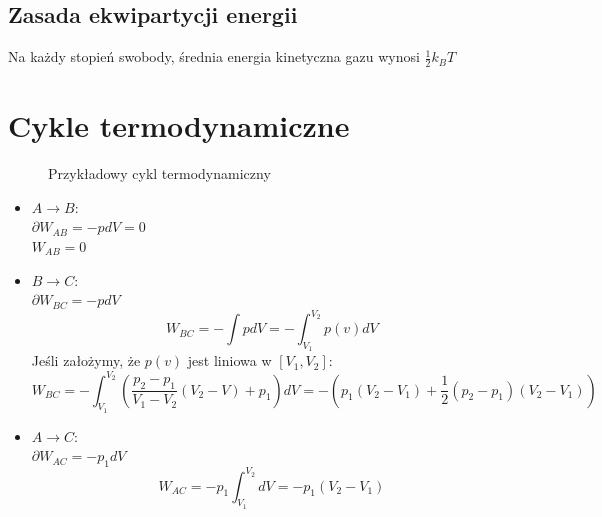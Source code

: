 \documentclass{../notatki}
\begin{document}
\subsection{Zasada ekwipartycji energii}

Na każdy stopień swobody, średnia energia kinetyczna gazu wynosi
$\frac{1}{2} k_BT$

\section{Cykle termodynamiczne}

\begin{figure}[!tbh]
  \centering
  \caption{Przykładowy cykl termodynamiczny}
\end{figure}

\begin{examplebox}
  \begin{itemize}
    \item $A \rightarrow B$:\\
      $\partial W_{AB} = -pdV = 0$\\
      $W_{AB} = 0$
    \item $B \rightarrow C$:\\
      $\partial W_{BC} = -pdV$
      $$
      W_{BC} = - \int pdV = - \int_{V_1}^{V_2} p(v)dV
      $$
      Jeśli założymy, że $p(v)$ jest liniowa w $[V_1, V_2]$:
      $$
      W_{BC} = - \int_{V_1}^{V_2} \left(\frac{p_2 - p_1}{V_1 - V_2}(V_2 - V)
      + p_1\right)dV = -\left(p_1(V_2 - V_1) + \frac{1}{2}(p_2 -
      p_1)(V_2 - V_1)\right)
      $$
    \item $A \rightarrow C$:\\
      $\partial W_{AC} = -p_1dV$
      $$
      W_{AC} = -p_1\int_{V_1}^{V_2} dV = -p_1(V_2 - V_1)
      $$
  \end{itemize}
\end{examplebox}
\end{document}
